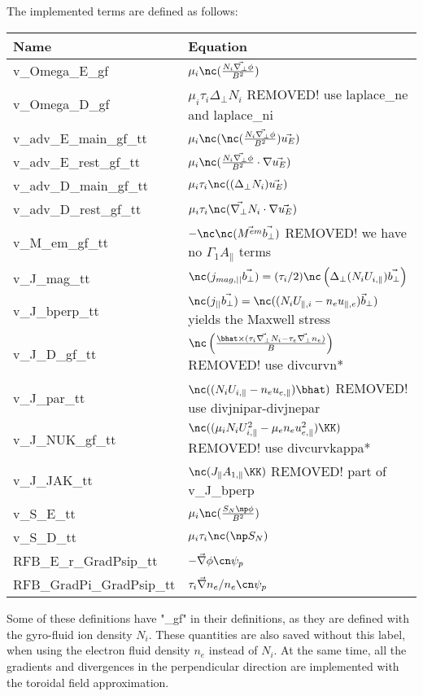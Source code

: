 The implemented terms are defined as follows:
\begin{longtable}{ll}
\toprule
\rowcolor{gray!50}\textbf{Name} &  \textbf{Equation}\\
\midrule
    v\_Omega\_E\_gf &$ \mu_i\nc(\frac{N_i\vec{\nabla_\perp}\phi}{B^2})$ \\
    v\_Omega\_D\_gf &$ \mu_i\tau_i \Delta_\perp N_i$ REMOVED! use laplace\_ne and laplace\_ni \\
    v\_adv\_E\_main\_gf\_tt &$ \mu_i\nc(\nc (\frac{N_i\vec{\nabla_\perp}\phi}{B^2})\vec{u_E})   $\\
    v\_adv\_E\_rest\_gf\_tt &$ \mu_i\nc(\frac{N_i\vec{\nabla_\perp}\phi}{B^2}\cdot\nabla \vec{u_E})  $\\
    v\_adv\_D\_main\_gf\_tt &$  \mu_i\tau_i \nc((\Delta_\perp N_i)\vec{u_E})   $\\
    v\_adv\_D\_rest\_gf\_tt &$  \mu_i\tau_i \nc(\vec{\nabla_\perp} N_i\cdot\nabla \vec{u_E})  $\\
    v\_M\_em\_gf\_tt &$  -\nc\nc(\vec{M^{em}}\vec{b_\perp})$ REMOVED! we have no $\Gamma_1 A_\parallel$ terms \\
    v\_J\_mag\_tt &$ \nc(j_{mag,||}\vec{b_\perp})=(\tau_i/2)\nc\left(\Delta_\perp( N_i U_{i,\parallel})\vec{b_\perp}\right)  $\\
    v\_J\_bperp\_tt &$ \nc(j_{||}\vec{b_\perp}) = \nc ((N_i U_{\parallel,i} - n_e u_{\parallel,e})\vec b_\perp)$ yields the Maxwell stress\\
    v\_J\_D\_gf\_tt &$ \nc\left(\frac{\bhat\times(\tau_i\vec{\nabla_\perp} N_i-\tau_e\vec{\nabla_\perp} n_e)}{B}\right) $ REMOVED! use divcurvn*\\
    v\_J\_par\_tt &$ \nc((N_i U_{i,\parallel} - n_e u_{e,\parallel})\bhat)  $ REMOVED! use divjnipar-divjnepar\\
    v\_J\_NUK\_gf\_tt &$ \nc((\mu_iN_iU_{i,\parallel}^2-\mu_en_eu_{e,\parallel}^2)\KK)  $ REMOVED! use divcurvkappa*\\
    v\_J\_JAK\_tt &$ \nc(J_\parallel A_{1,\parallel}\KK)  $ REMOVED! part of v\_J\_bperp\\
    v\_S\_E\_tt &$ \mu_i\nc(\frac{S_N\np\phi}{B^2})  $\\
    v\_S\_D\_tt &$ \mu_i\tau_i\nc(\np S_{N})  $\\
    RFB\_E\_r\_GradPsip\_tt &$ -\vec{\nabla}\phi\cn\psi_p  $\\
    RFB\_GradPi\_GradPsip\_tt &$ \tau_i\vec{\nabla} n_e/n_e\cn\psi_p  $\\
\bottomrule
\end{longtable}
Some of these definitions have "\_gf" in their definitions, as they are defined with the gyro-fluid ion density $N_i$. These quantities are also saved without this label, when using the electron fluid density $n_e$ instead of $N_i$. At the same time, all the gradients and divergences in the perpendicular direction are implemented with the toroidal field approximation.


